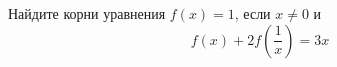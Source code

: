 \begin{ex}
	\begin{condition}
		Найдите корни уравнения \( f(x)=1 \), если \( x\neq0 \) и \[ f(x)+2f\left( \dfrac{1}{x} \right)=3x \]
	\end{condition}
\end{ex}